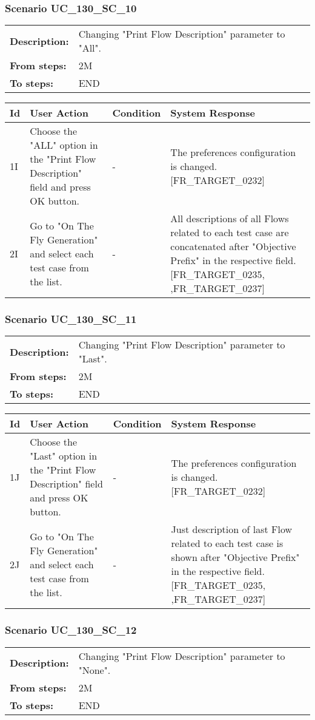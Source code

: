 \documentclass[a4paper,11pt]{article}
\newcommand{\bl}{\\ \hline}
\begin{document}
\subsubsection*{Scenario UC_130_SC_10}
\begin{tabular}{p{1in}p{4in}}
{\bf Description:} & Changing "Print Flow Description" parameter to "All". \\
{\bf From steps:} & 2M \\
{\bf To steps:} & END \\
\end{tabular}
 
\begin{tabular}{|p{0.8in}|p{1.6in}|p{1.6in}|p{1.6in}|}
\hline
Id & User Action & Condition & System Response  \bl 
1I & Choose the "ALL" option in the "Print Flow Description" field and press OK button. & - & The preferences configuration is changed. [FR_TARGET_0232] \bl 
2I & Go to "On The Fly Generation" and select each test case from the list. & - & All descriptions of all Flows related to each test case are concatenated after "Objective Prefix" in the respective field. [FR_TARGET_0235, ,FR_TARGET_0237] \bl 
\end{tabular}
\subsubsection*{Scenario UC_130_SC_11}
\begin{tabular}{p{1in}p{4in}}
{\bf Description:} & Changing "Print Flow Description" parameter to "Last". \\
{\bf From steps:} & 2M \\
{\bf To steps:} & END \\
\end{tabular}
 
\begin{tabular}{|p{0.8in}|p{1.6in}|p{1.6in}|p{1.6in}|}
\hline
Id & User Action & Condition & System Response  \bl 
1J & Choose the "Last" option in the "Print Flow Description" field and press OK button. & - & The preferences configuration is changed. [FR_TARGET_0232] \bl 
2J & Go to "On The Fly Generation" and select each test case from the list. & - & Just description of last Flow related to each test case is shown after "Objective Prefix" in the respective field. [FR_TARGET_0235, ,FR_TARGET_0237] \bl 
\end{tabular}
\subsubsection*{Scenario UC_130_SC_12}
\begin{tabular}{p{1in}p{4in}}
{\bf Description:} & Changing "Print Flow Description" parameter to "None". \\
{\bf From steps:} & 2M \\
{\bf To steps:} & END \\
\end{tabular}
 
\end{document}
